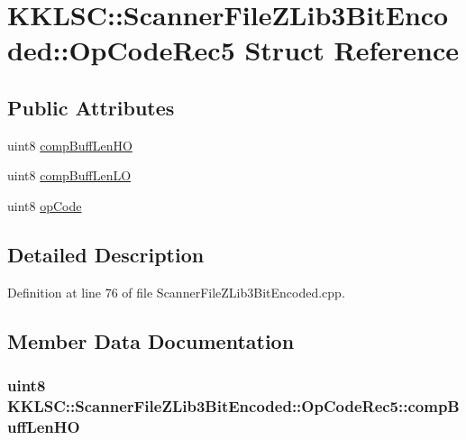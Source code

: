\hypertarget{struct_scanner_file_z_lib3_bit_encoded_1_1_op_code_rec5}{}\section{K\+K\+L\+SC\+:\+:Scanner\+File\+Z\+Lib3\+Bit\+Encoded\+:\+:Op\+Code\+Rec5 Struct Reference}
\label{struct_scanner_file_z_lib3_bit_encoded_1_1_op_code_rec5}
\subsection*{Public Attributes}
\begin{DoxyCompactItemize}
\item 
uint8 \hyperlink{struct_scanner_file_z_lib3_bit_encoded_1_1_op_code_rec5_afaf13e8afb5be9a2f61b71949ad3de35}{comp\+Buff\+Len\+HO}
\item 
uint8 \hyperlink{struct_scanner_file_z_lib3_bit_encoded_1_1_op_code_rec5_aceee0b4ce69cc47ac78e17ddcda116ec}{comp\+Buff\+Len\+LO}
\item 
uint8 \hyperlink{struct_scanner_file_z_lib3_bit_encoded_1_1_op_code_rec5_a587dcb7f9f189fb545a37606e206ded5}{op\+Code}
\end{DoxyCompactItemize}


\subsection{Detailed Description}


Definition at line 76 of file Scanner\+File\+Z\+Lib3\+Bit\+Encoded.\+cpp.



\subsection{Member Data Documentation}
\subsubsection[{\texorpdfstring{comp\+Buff\+Len\+HO}{compBuffLenHO}}]{\setlength{\rightskip}{0pt plus 5cm}uint8 K\+K\+L\+S\+C\+::\+Scanner\+File\+Z\+Lib3\+Bit\+Encoded\+::\+Op\+Code\+Rec5\+::comp\+Buff\+Len\+HO}\hypertarget{struct_scanner_file_z_lib3_bit_encoded_1_1_op_code_rec5_afaf13e8afb5be9a2f61b71949ad3de35}{}\label{struct_scanner_file_z_lib3_bit_encoded_1_1_op_code_rec5_afaf13e8afb5be9a2f61b71949ad3de35}


